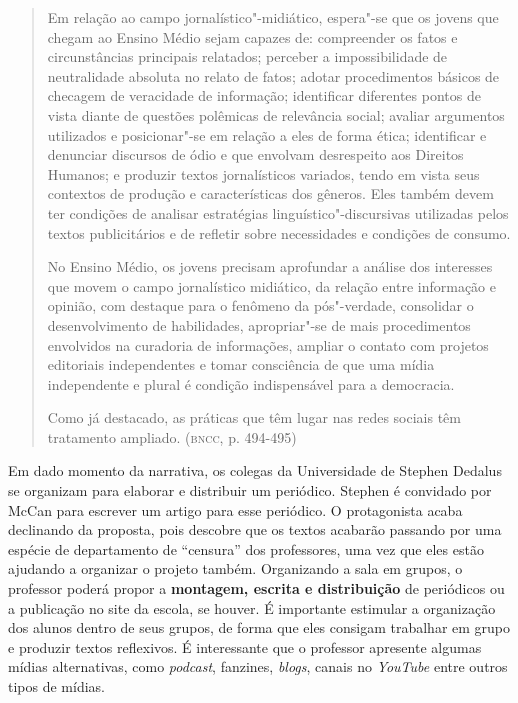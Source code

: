 \documentclass[12pt]{extarticle}
\begin{document}
\begin{quote}
Em relação ao campo jornalístico"-midiático, espera"-se que os jovens
que chegam ao Ensino Médio sejam capazes de: compreender os fatos e
circunstâncias principais relatados; perceber a impossibilidade de
neutralidade absoluta no relato de fatos; adotar procedimentos básicos
de checagem de veracidade de informação; identificar diferentes pontos
de vista diante de questões polêmicas de relevância social; avaliar
argumentos utilizados e posicionar"-se em relação a eles de forma ética;
identificar e denunciar discursos de ódio e que envolvam desrespeito aos
Direitos Humanos; e produzir textos jornalísticos variados, tendo em
vista seus contextos de produção e características dos gêneros. Eles
também devem ter condições de analisar estratégias
linguístico"-discursivas utilizadas pelos textos publicitários e de
refletir sobre necessidades e condições de consumo.

No Ensino Médio, os jovens precisam aprofundar a análise dos interesses
que movem o campo jornalístico midiático, da relação entre informação e
opinião, com destaque para o fenômeno da pós"-verdade, consolidar o
desenvolvimento de habilidades, apropriar"-se de mais procedimentos
envolvidos na curadoria de informações, ampliar o contato com projetos
editoriais independentes e tomar consciência de que uma mídia
independente e plural é condição indispensável para a democracia.

Como já destacado, as práticas que têm lugar nas redes sociais têm
tratamento ampliado. (\textsc{bncc}, p. 494-495)
\end{quote}

Em dado momento da narrativa, os colegas da Universidade de Stephen
Dedalus se organizam para elaborar e distribuir um periódico. Stephen
é convidado por McCan para escrever um artigo para esse periódico. O
protagonista acaba declinando da proposta, pois descobre que os textos
acabarão passando por uma espécie de departamento de ``censura'' dos
professores, uma vez que eles estão ajudando a organizar o projeto
também. Organizando a sala em grupos, o professor poderá propor a
\textbf{montagem, escrita e distribuição} de periódicos ou a
publicação no site da escola, se houver. É importante estimular a
organização dos alunos dentro de seus grupos, de forma que eles
consigam trabalhar em grupo e produzir textos reflexivos. É
interessante que o professor apresente algumas mídias alternativas,
como \emph{podcast}, fanzines, \emph{blogs}, canais no \emph{YouTube}
entre outros tipos de mídias.
\end{document}
